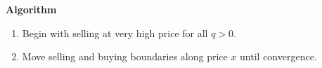 \documentclass{beamer}
\begin{document}
\begin{frame}
{\bf Algorithm}
\begin{enumerate}
  \item Begin with selling at very high price for all $q>0$.
  \item Move selling and buying boundaries along price $x$ until convergence. 



\end{enumerate}

\end{frame}


%
%
%
%
%
%
%
%
%
%
\end{document}
